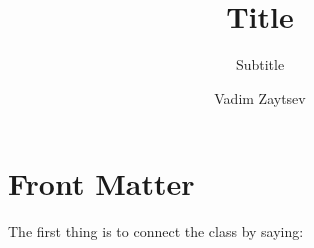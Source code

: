 \documentclass{uvamscse}
\title{Title}
\subtitle{Subtitle}
\author{Vadim Zaytsev}
\newcommand{\filename}{empty}
\begin{document}
\maketitle

\chapter{Front Matter}

The first thing is to connect the class by saying:

{%


}
\end{document}
